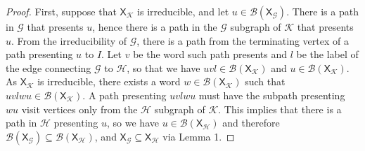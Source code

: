 \documentclass[hidelinks]{article}
\newcommand{\Lc}{\mathcal{L}}  %
\newcommand{\Gc}{\mathcal{G}}  %
\newcommand{\Hc}{\mathcal{H}}  %
\newcommand{\Bc}{\mathcal{B}}
\newcommand{\Kc}{\mathcal{K}}
\newcommand{\shift}[1]{\mathsf{X}_{#1}}
\theoremstyle{definition}
\begin{document}
    \begin{proof}
        First, suppose that \(\shift{\Kc}\) is irreducible, and let \(u \in \Bc(\shift{\Gc})\). 
        There is a path in \(\Gc\) that presents \(u\), hence there is a path in the 
        \(\Gc\) subgraph of \(\Kc\) that presents \(u\). From the irreducibility of 
        \(\Gc\), there is a path from the terminating vertex of a path presenting 
        \(u\) to \(I\). Let \(v\) be the word such path presents and \(l\) be 
        the label of the edge connecting \(\Gc\) to \(\Hc\), so that we have 
        \(uvl \in \Bc(\shift{\Kc})\) and \(u \in \Bc(\shift{\Kc})\). As \(\shift{\Kc}\)
        is irreducible, there exists a word \(w \in \Bc(\shift{\Kc})\) such that 
        \(uvlwu \in \Bc(\shift{\Kc})\). A path presenting \(uvlwu\) must have the 
        subpath presenting \(wu\) visit vertices only from the \(\Hc\) subgraph of \(\Kc\).
        This implies that there is a path in \(\Hc\) presenting \(u\), so we have 
        \(u \in \Bc(\shift{\Hc})\) and therefore \(\Bc(\shift{\Gc}) \subseteq \Bc(\shift{\Hc})\),
        and \(\shift{\Gc} \subseteq \shift{\Hc}\) via Lemma 1.
    \end{proof}
\end{document}
